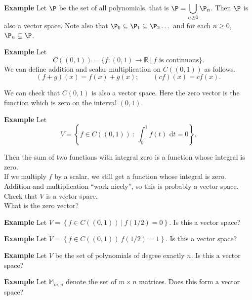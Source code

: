  \begin{frame}[fragile]

\textbf{Example}
 Let $\P$ be the set of all polynomials, that is 
$\displaystyle \P = \bigcup_{n\geq 0} \P_n$.  Then $\P$ is also a 
vector space. Note also that $\P_0 \subseteq \P_1 \subseteq \P_2 \dots $ 
and for each $n \geq 0$, $\P_n \subseteq \P$.  



\textbf{Example}
Let $$C( (0,1) ) = \{ f:(0,1)\rightarrow \mathbb R \ |\  \mbox{$f$ is continuous} \}.$$
We can define addition and scalar multiplication on $C( (0,1) )$ as follows.
$$ (f+g)(x) = f(x) + g(x); \qquad (cf)(x)=c f(x).$$

We can check that $C(0,1)$ is also a vector space.
Here the zero vector is the function which is zero on the interval $(0,1)$.

\end{frame}






 \begin{frame}[fragile]

\textbf{Example}
Let $$V= \left\{ f\in C( (0,1) ) \ :\ \int_{0}^1 f(t) \mbox{ d}t = 0 \right\}.$$


Then the sum of two functions with integral zero is a function whose integral is zero.  \\ 
If we multiply $f$ by a scalar, we still get a function whose integral is zero.  \\ 
Addition and multiplication ``work nicely'', so this is probably a vector space.  \\ 
Check that $V$ is a vector space.  \\ 
What is the zero vector?

\end{frame}






 \begin{frame}[fragile]

\textbf{Example}
 Let $V= \left\{ f \in C( (0,1) ) \ |\ f(1/2)=0\right\}$.
Is this a vector space?



\textbf{Example}
 Let $V= \left\{f \in C( (0,1) )\   f(1/2)=1 \right\}$.
Is this a vector space?



\textbf{Example}
Let $V$ be the set of polynomials of degree exactly $n$.  Is this a 
vector space?



\textbf{Example}
Let $\mathbb M_{m,n}$ denote the set of $m\times n$ matrices.  Does this form
a vector space?

\end{frame}







